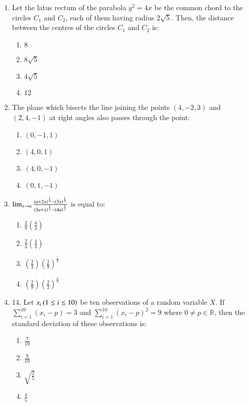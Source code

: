 \documentclass[journal,9pt,twocolumn]{IEEEtran}
\begin{document}
\begin{enumerate}
\item Let the latus rectum of the parabola $y^2 = 4x$ be the common chord to the circles $C_1$ and $C_2$, each of them having radius $2\sqrt{5}$. Then, the distance between the centres of the circles $C_1$ and $C_2$ is:

\begin{multicols}{4}
\begin{enumerate}
    \item $8$
    \item $8\sqrt{5}$
    \item $4\sqrt{5}$
    \item $12$
\end{enumerate}
\end{multicols}

\item The plane which bisects the line joining the points $(4, -2, 3)$ and $(2, 4, -1)$ at right angles also passes through the point:

\begin{multicols}{2}
\begin{enumerate}
    \item $(0, -1, 1)$
    \item $(4, 0, 1)$
    \item $(4, 0, -1)$
    \item $(0, 1, -1)$
\end{enumerate}
\end{multicols}

\item $\lim_{x \to a} \frac{\left(a + 2x\right)^{\frac{1}{3}} - \left(3x\right)^{\frac{1}{3}}}{\left(3a + x\right)^{\frac{1}{3}} - \left(4a\right)^{\frac{1}{3}}}$ is equal to:
\begin{multicols}{2}
\begin{enumerate}
    \item $\frac{2}{9} \left(\frac{4}{3}\right)$
    \item $\frac{2}{3} \left(\frac{4}{3}\right)$
    \item $\left(\frac{2}{3}\right) \left(\frac{2}{9}\right)^{\frac{1}{3}}$
    \item $\left(\frac{2}{9}\right) \left(\frac{2}{3}\right)^{\frac{1}{3}}$
\end{enumerate}
\end{multicols}

\item 14. Let $x_{i} \left(1 \leq i \leq 10\right)$ be ten observations of a random variable $X$. If
$\sum_{i=1}^{10}(x_{i}-p)=3$
and
$\sum_{i=1}^{10}(x_{i}-p)^{2}=9$
where $0 \neq p \in \mathbb{R}$, then the standard deviation of these observations is:
\begin{multicols}{4}
\begin{enumerate}
\item  $\frac{7}{10}$
\item $\frac{9}{10}$
\item $\sqrt{\frac{3}{5}}$
\item  $\frac{4}{5}$
\end{enumerate}
\end{multicols}


\end{enumerate}
\end{document}
